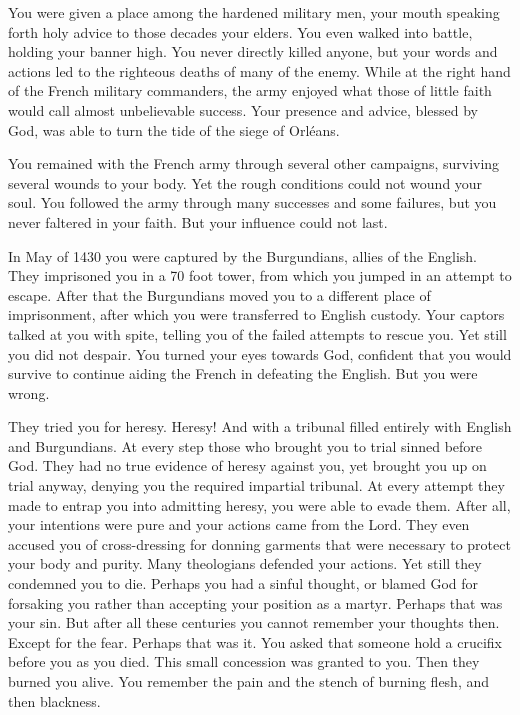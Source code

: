 \documentclass[char]{guildcamp4}
\begin{document}
You were given a place among the hardened military men, your mouth speaking forth holy advice to those decades your elders. You even walked into battle, holding your banner high. You never directly killed anyone, but your words and actions led to the righteous deaths of many of the enemy. While at the right hand of the French military commanders, the army enjoyed what those of little faith would call almost unbelievable success. Your presence and advice, blessed by God, was able to turn the tide of the siege of Orl\'{e}ans.

You remained with the French army through several other campaigns, surviving several wounds to your body. Yet the rough conditions could not wound your soul. You followed the army through many successes and some failures, but you never faltered in your faith. But your influence could not last.

In May of 1430 you were captured by the Burgundians, allies of the English. They imprisoned you in a 70 foot tower, from which you jumped in an attempt to escape. After that the Burgundians moved you to a different place of imprisonment, after which you were transferred to English custody. Your captors talked at you with spite, telling you of the failed attempts to rescue you. Yet still you did not despair. You turned your eyes towards God, confident that you would survive to continue aiding the French in defeating the English. But you were wrong.

They tried you for heresy. Heresy! And with a tribunal filled entirely with English and Burgundians. At every step those who brought you to trial sinned before God. They had no true evidence of heresy against you, yet brought you up on trial anyway, denying you the required impartial tribunal. At every attempt they made to entrap you into admitting heresy, you were able to evade them. After all, your intentions were pure and your actions came from the Lord. They even accused you of cross-dressing for donning garments that were necessary to protect your body and purity. Many theologians defended your actions. Yet still they condemned you to die. Perhaps you had a sinful thought, or blamed God for forsaking you rather than accepting your position as a martyr. Perhaps that was your sin. But after all these centuries you cannot remember your thoughts then. Except for the fear. Perhaps that was it. You asked that someone hold a crucifix before you as you died. This small concession was granted to you. Then they burned you alive. You remember the pain and the stench of burning flesh, and then blackness.
\end{document}
